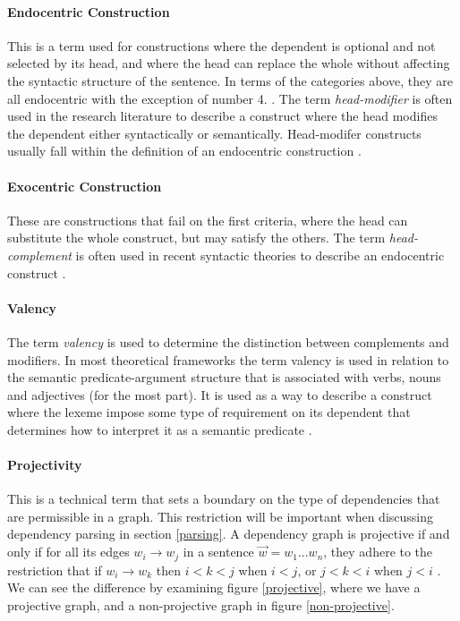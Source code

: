 \paragraph{Endocentric Construction} This is a term used for constructions where the dependent is optional and not selected by its head, and where the head can replace the whole without affecting the syntactic structure of the sentence. In terms of the categories above, they are all endocentric with the exception of number 4. \cite{KublerEtAl:09}. The term \textit{head-modifier} is often used in the research literature to describe a construct where the head modifies the dependent either syntactically or semantically. Head-modifer constructs usually fall within the definition of an endocentric construction \cite{Niv:05}.

\paragraph{Exocentric Construction} These are constructions that fail on the first criteria, where the head can substitute the whole construct, but may satisfy the others. The term \textit{head-complement} is often used in recent syntactic theories to describe an endocentric construct \cite{Niv:05}.

\paragraph{Valency} The term \textit{valency} is used to determine the distinction between complements and modifiers. In most theoretical frameworks the term valency is used in relation to the semantic predicate-argument structure that is associated with verbs, nouns and adjectives (for the most part). It is used as a way to describe a construct where the lexeme impose some type of requirement on its dependent that determines how to interpret it as a semantic predicate \cite{Niv:05}.

\paragraph{Projectivity} This is a technical term that sets a boundary on the type of dependencies that are permissible in a graph. This restriction will be important when discussing dependency parsing in section \ref{parsing}. A dependency graph is projective if and only if for all its edges $w_i \rightarrow w_j$ in a sentence $\vec{w} = w_1 ... w_n$, they adhere to the restriction that if $w_i \rightarrow w_k$ then $i < k < j$ when $i < j$, or $j < k < i$ when $j < i$ \cite{KublerEtAl:09}. We can see the difference by examining figure \ref{projective}, where we have a projective graph, and a non-projective graph in figure \ref{non-projective}.

